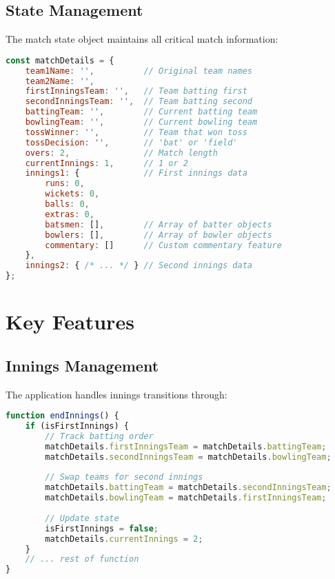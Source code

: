 \documentclass[12pt]{article}
\begin{document}
\subsection*{State Management}
The match state object maintains all critical match information:

\begin{lstlisting}[language=JavaScript]
const matchDetails = {
    team1Name: '',          // Original team names
    team2Name: '',
    firstInningsTeam: '',   // Team batting first
    secondInningsTeam: '',  // Team batting second
    battingTeam: '',        // Current batting team
    bowlingTeam: '',        // Current bowling team
    tossWinner: '',         // Team that won toss
    tossDecision: '',       // 'bat' or 'field'
    overs: 2,               // Match length
    currentInnings: 1,      // 1 or 2
    innings1: {             // First innings data
        runs: 0,
        wickets: 0,
        balls: 0,
        extras: 0,
        batsmen: [],        // Array of batter objects
        bowlers: [],        // Array of bowler objects
        commentary: []      // Custom commentary feature
    },
    innings2: { /* ... */ } // Second innings data
};
\end{lstlisting}

\section*{Key Features}

\subsection*{Innings Management}
The application handles innings transitions through:

\begin{lstlisting}[language=JavaScript]
function endInnings() {
    if (isFirstInnings) {
        // Track batting order
        matchDetails.firstInningsTeam = matchDetails.battingTeam;
        matchDetails.secondInningsTeam = matchDetails.bowlingTeam;
        
        // Swap teams for second innings
        matchDetails.battingTeam = matchDetails.secondInningsTeam;
        matchDetails.bowlingTeam = matchDetails.firstInningsTeam;
        
        // Update state
        isFirstInnings = false;
        matchDetails.currentInnings = 2;
    }
    // ... rest of function
}
\end{lstlisting}
\end{document}
